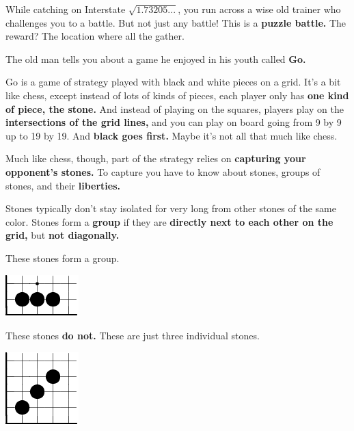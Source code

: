 

While catching \mappMobimon{} on Interstate \(\sqrt{1.73205...}\),
you run across a wise old
\mappMobimon{} trainer who challenges you to a \mappMobimon{} battle. But not
just any \mappMobimon{} battle! This is a \textbf{puzzle battle.} The reward?
The location where all the \mappMobimon{} gather.

The old man tells you about a game he enjoyed in his youth called \textbf{Go.}

Go is a game of strategy played with black and white pieces on a grid. It's a
bit like chess, except instead of lots of kinds of pieces, each player only has
\textbf{one kind of piece, the stone.} And instead of playing on the squares,
players play on the \textbf{intersections of the grid lines,} and you can play
on board going from 9 by 9 up to 19 by 19. And \textbf{black goes first.} Maybe
it's not all that much like chess.

Much like chess, though, part of the strategy relies on \textbf{capturing your
  opponent's stones.} To capture you have to know about stones, groups of
stones, and their \textbf{liberties.}

Stones typically don't stay isolated for very long from other stones of the same
color. Stones form a \textbf{group} if they are \textbf{directly next to each
  other on the grid,} but \textbf{not diagonally.}

These stones form a group.

\begin{center}
  \includegraphics{gogetem/assets/explanation1-crop}
\end{center}

These stones \textbf{do not.} These are just three individual stones.

\begin{center}
  \includegraphics{gogetem/assets/explanation2-crop}
\end{center}

